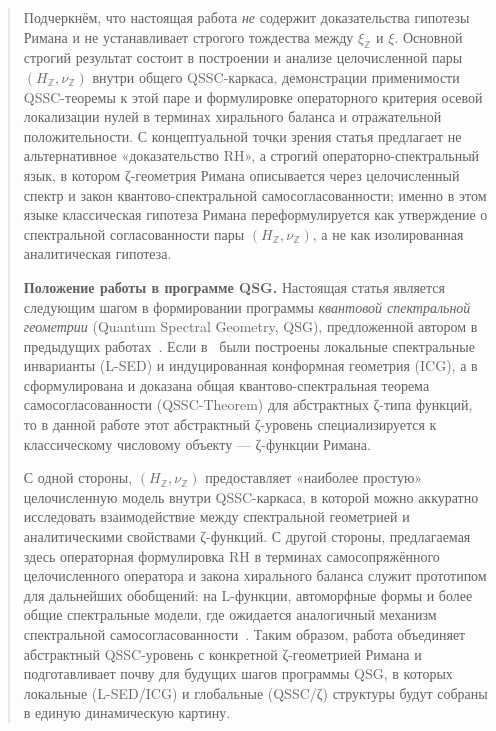 \documentclass{article}
\numberwithin{equation}{section}
\theoremstyle{plain}
\theoremstyle{definition}
\theoremstyle{remark}
\begin{document}
\begin{abstract}
Подчеркнём, что настоящая работа \emph{не} содержит доказательства гипотезы Римана и не устанавливает строгого тождества между $\xi_{\mathbb Z}$ и $\xi$. 
Основной строгий результат состоит в построении и анализе целочисленной пары $(H_{\mathbb Z},\nu_{\mathbb Z})$ внутри общего QSSC-каркаса, демонстрации применимости QSSC-теоремы к этой паре и формулировке операторного критерия осевой локализации нулей в терминах хирального баланса и отражательной положительности. 
С концептуальной точки зрения статья предлагает не альтернативное «доказательство RH», а строгий операторно-спектральный язык, в котором ζ-геометрия Римана описывается через целочисленный спектр и закон квантово-спектральной самосогласованности; именно в этом языке классическая гипотеза Римана переформулируется как утверждение о спектральной согласованности пары $(H_{\mathbb Z},\nu_{\mathbb Z})$, а не как изолированная аналитическая гипотеза.

\medskip
\noindent\textbf{Положение работы в программе QSG.}
Настоящая статья является следующим шагом в формировании программы \emph{квантовой спектральной геометрии} (Quantum Spectral Geometry, QSG), предложенной автором в предыдущих работах~\cite{Monakhov-QSG-000,Monakhov-QSG-001,Monakhov-QSG-002}. 
Если в~\cite{Monakhov-QSG-001} были построены локальные спектральные инварианты (L-SED) и индуцированная конформная геометрия (ICG), а в~\cite{Monakhov-QSG-002} сформулирована и доказана общая квантово-спектральная теорема самосогласованности (QSSC-Theorem) для абстрактных ζ-типа функций, то в данной работе этот абстрактный ζ-уровень специализируется к классическому числовому объекту — ζ-функции Римана.

С одной стороны, $(H_{\mathbb Z},\nu_{\mathbb Z})$ предоставляет «наиболее простую» целочисленную модель внутри QSSC-каркаса, в которой можно аккуратно исследовать взаимодействие между спектральной геометрией и аналитическими свойствами ζ-функций. 
С другой стороны, предлагаемая здесь операторная формулировка RH в терминах самосопряжённого целочисленного оператора и закона хирального баланса служит прототипом для дальнейших обобщений: на L-функции, автоморфные формы и более общие спектральные модели, где ожидается аналогичный механизм спектральной самосогласованности~\cite{ConnesMarcolli2008,ChamseddineConnes1997}. 
Таким образом, работа объединяет абстрактный QSSC-уровень с конкретной ζ-геометрией Римана и подготавливает почву для будущих шагов программы QSG, в которых локальные (L-SED/ICG) и глобальные (QSSC/ζ) структуры будут собраны в единую динамическую картину.
\end{abstract}
\end{document}
